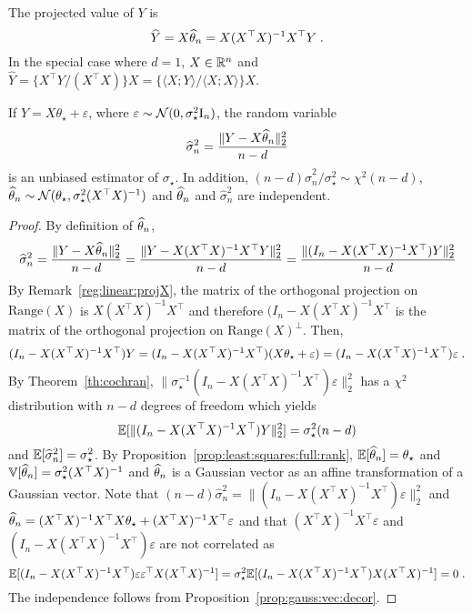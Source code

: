 \begin{remark}
\label{reg:linear:projX:d1}
The projected value of $Y$ is 
$$
\widehat Y = X \widehat {\theta}_n = X(X^\top X)^{-1}X^\top Y\;.
$$
In the special case where $d = 1$, $X\in\mathbb{R}^n$ and $\widehat Y = \{X^\top Y/(X^\top X)\}X = \{\langle X ; Y\rangle / \langle X ; X \rangle\}X $.
\end{remark}

\begin{shaded}
\begin{proposition}
\label{prop:least:squares:full:rank:variance}
If $Y = X\theta_\star + \varepsilon$, where $\varepsilon \sim \mathcal{N}(0,\sigma_\star^2\mathrm{I}_n)$, the random variable
\[
\widehat \sigma^2_n =\frac{\|Y - X\widehat {\theta}_n \|_2^2}{n-d}
\]
is an unbiased estimator of $\sigma_\star$. In addition, $(n-d)\widehat \sigma^2_n/\sigma_\star^2\sim\chi^2(n-d)$, $\widehat {\theta}_n \sim \mathcal{N}(\theta_{\star},\sigma_\star^2(X^\top X)^{-1})$ and $\widehat {\theta}_n$ and $\widehat \sigma^2_n$ are independent.
\end{proposition}
\end{shaded}

\begin{proof}
By definition of $\widehat {\theta}_n$,
\[
\widehat \sigma^2_n =\frac{\|Y - X\widehat {\theta}_n \|_2^2}{n-d} = \frac{\|Y - X(X^\top X)^{-1}X^\top Y\|_2^2}{n-d} = \frac{\|(I_n - X(X^\top X)^{-1}X^\top )Y\|_2^2}{n-d}
\]
By Remark~\ref{reg:linear:projX}, the matrix of the orthogonal projection on $\mathrm{Range}(X)$ is $X(X^\top X)^{-1}X^\top$ and therefore $(I_n - X(X^\top X)^{-1}X^\top$ is the matrix  of the orthogonal projection on $\mathrm{Range}(X)^{\perp}$. Then,
\[
(I_n - X(X^\top X)^{-1}X^\top)Y = (I_n - X(X^\top X)^{-1}X^\top)(X\theta_\star + \varepsilon) = (I_n - X(X^\top X)^{-1}X^\top)\varepsilon\;.
\]
By Theorem~\ref{th:cochran}, $\|\sigma_\star^{-1}(I_n - X(X^\top X)^{-1}X^\top)\varepsilon\|_2^2$ has a $\chi^2$ distribution with $n-d$ degrees of freedom which yields
\[
\mathbb{E}[\|(I_n - X(X^\top X)^{-1}X^\top)Y\|_2^2] = \sigma_\star^2(n-d)
\]
and $\mathbb{E}[\widehat \sigma^2_n ] = \sigma_\star^2$. By Proposition~\ref{prop:least:squares:full:rank}, $\mathbb{E}[\widehat {\theta}_n] = \theta_\star$ and $\mathbb{V}[\widehat {\theta}_n] = \sigma_\star^2(X^\top X)^{-1}$ and $\widehat {\theta}_n$ is a Gaussian vector as an  affine transformation of a Gaussian vector. Note that $(n-d)\widehat \sigma^2_n = \|(I_n - X(X^\top X)^{-1}X^\top)\varepsilon\|_2^2$ and $\widehat {\theta}_n = (X^\top X)^{-1}X^\top X\theta_{\star} + (X^\top X)^{-1}X^\top\varepsilon$ and that $(X^\top X)^{-1}X^\top\varepsilon$ and $(I_n - X(X^\top X)^{-1}X^\top)\varepsilon$ are not correlated as 
\[
\mathbb{E}[(I_n - X(X^\top X)^{-1}X^\top)\varepsilon \varepsilon^\top X(X^\top X)^{-1}] = \sigma_\star^2\mathbb{E}[(I_n - X(X^\top X)^{-1}X^\top)X(X^\top X)^{-1}] = 0\;.
\]
The independence follows from Proposition~\ref{prop:gauss:vec:decor}.
\end{proof}

